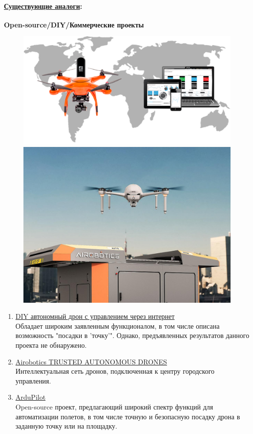 \documentclass[a4paper,12pt]{article} %
\begin{document}
\paragraph{\underline{Существующие аналоги}:}
\textbf{Open-source/DIY/Коммерческие проекты}
\begin{figure}
    \centering
    \includegraphics[width=0.95\linewidth]{../img/diy_drone.png}
    \includegraphics[width=0.95\linewidth]{../img/airbotics.png}
\end{figure}
\begin{enumerate}
    \item \href{https://habr.com/ru/articles/414121/}{DIY автономный дрон с управлением через интернет} \\
    Обладает широким заявленным функционалом, в том числе описана возможность "посадки в 'точку'".
    Однако, предъявленных результатов данного проекта не обнаружено.
    \item \href{https://www.airoboticsdrones.com}{Airobotics TRUSTED AUTONOMOUS DRONES} \\
    Интеллектуальная сеть дронов, подключенная к центру городского управления.
    \item \href{https://www.dji.com/ru}{ArduPilot} \\
    Open-source проект, предлагающий широкий спектр функций для автоматизации полетов, в том числе точную и безопасную посадку дрона в заданную точку или на площадку.
\end{enumerate}
\end{document}
